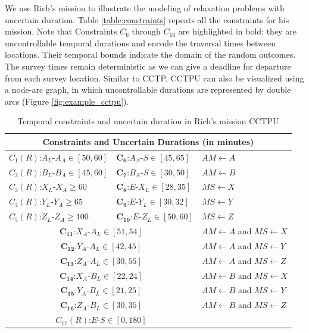 \documentclass[jair,twoside,11pt,theapa]{article}
\begin{document}
We use Rich's mission to illustrate the modeling of relaxation problems
with uncertain duration. Table \ref{table:constraints} repeats all the
constraints for his mission. Note that Constraints $C_6$ through $C_{16}$ are
highlighted in bold: they are uncontrollable temporal durations and encode the
traversal times between locations. Their temporal bounds indicate the domain of
the random outcomes. The survey times remain deterministic as we can give a deadline for departure from each survey location. Similar to CCTP, CCTPU can also be visualized using a
node-arc graph, in which uncontrollable durations are represented by double arcs
(Figure \ref{fig:example_cctpu}).

\begin{table}[ht!]	
	\centering
	\begin{tabular}{| m{4.2cm} m{4.2cm} m{4.5cm}|}
		\hline
		\multicolumn{3}{|c|}{\textbf{Constraints and Uncertain Durations (in minutes)}} \\		
		\hline		
		$C_1(R)$:$A_L$-$A_A\in [50,60]$ & $\mathbf{C_6}$:$A_A$-$S\in[45,65]$ & $AM \leftarrow A$ \\ 
		$C_2(R)$:$B_L$-$B_A\in [45,60]$ & $\mathbf{C_7}$:$B_A$-$S\in[30,50]$ & $AM \leftarrow B$ \\ 
		$C_3(R)$:$X_L$-$X_A\geq60$ & $\mathbf{C_8}$:$E$-$X_L\in[28,35]$ & $MS \leftarrow X$ \\ 
		$C_4(R)$:$Y_L$-$Y_A\geq65$ & $\mathbf{C_9}$:$E$-$Y_L\in[30,32]$ & $MS \leftarrow Y$ \\ 
		$C_5(R)$:$Z_L$-$Z_A\geq100$ & $\mathbf{C_{10}}$:$E$-$Z_L\in[50,60]$ & $MS \leftarrow Z$ \\ 
		\hline
		\multicolumn{2}{|c}{$\mathbf{C_{11}}$:$X_A$-$A_L\in[51,54]$} & $AM \leftarrow A$ and $MS \leftarrow X$ \\ 
		\multicolumn{2}{|c}{$\mathbf{C_{12}}$:$Y_A$-$A_L\in[42,45]$} & $AM \leftarrow A$ and $MS \leftarrow Y$ \\ 
		\multicolumn{2}{|c}{$\mathbf{C_{13}}$:$Z_A$-$A_L\in[30,55]$} & $AM \leftarrow A$ and $MS \leftarrow Z$ \\ 
		\multicolumn{2}{|c}{$\mathbf{C_{14}}$:$X_A$-$B_L\in[22,24]$} & $AM \leftarrow B$ and $MS \leftarrow X$ \\ 
		\multicolumn{2}{|c}{$\mathbf{C_{15}}$:$Y_A$-$B_L\in[21,25]$} & $AM \leftarrow B$ and $MS \leftarrow Y$ \\ 
		\multicolumn{2}{|c}{$\mathbf{C_{16}}$:$Z_A$-$B_L\in[30,35]$} & $AM \leftarrow B$ and $MS \leftarrow Z$ \\ \hline
		\multicolumn{2}{|c}{$C_{17}(R)$:$E$-$S\in[0,180]$} & \\
		\hline
	\end{tabular}
	\caption{Temporal constraints and uncertain duration in Rich's mission CCTPU}
	\label{table:stnu_constraints}
\end{table}
\end{document}

